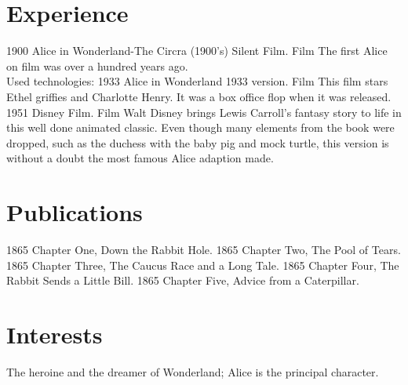 \documentclass[letterpaper]{curriculum_vitae} %
\begin{document}
\section{Experience}
\begin{twenty}
    \twentyitem
    {1900}
    {Alice in Wonderland-The Circra (1900's) Silent Film.}
    {Film}
    {
        The first Alice on film was over a hundred years ago.\\
        Used technologies: 
    }
    \twentyitem
    {1933}
    {Alice in Wonderland 1933 version.}
    {Film}
    {This film stars Ethel griffies and Charlotte Henry. It was a box office flop when it was released.}
    \twentyitem
    {1951}
    {Disney Film.}
    {Film}
    {Walt Disney brings Lewis Carroll's fantasy story to life in this well done animated classic. Even though many elements from the book were dropped, such as the duchess with the baby pig and mock turtle, this version is without a doubt the most famous Alice adaption made.}
\end{twenty}


\newpage

\makenextprofile

\section{Publications}
\begin{twentyshort}
  \twentyitemshort
    {1865}
    {Chapter One, Down the Rabbit Hole.}
  \twentyitemshort
    {1865}
    {Chapter Two, The Pool of Tears.}
  \twentyitemshort
    {1865}
    {Chapter Three,  The Caucus Race and a Long Tale.}
  \twentyitemshort
    {1865}
    {Chapter Four,  The Rabbit Sends a Little Bill.}
  \twentyitemshort
    {1865}
    {Chapter Five,  Advice from a Caterpillar.}
\end{twentyshort}

\section{Interests}
The heroine and the dreamer of Wonderland;  Alice is the principal character.
\end{document}
